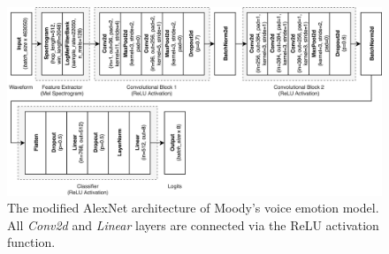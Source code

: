 \begin{figure}
    \centering
    \includegraphics[width=\textwidth]{assets/alexnet_architecture.png}
    \caption{The modified AlexNet architecture of Moody's voice emotion model. All \emph{Conv2d} and \emph{Linear} layers are connected via the ReLU activation function.}
    \label{fig:alexnet_architecture}
\end{figure}